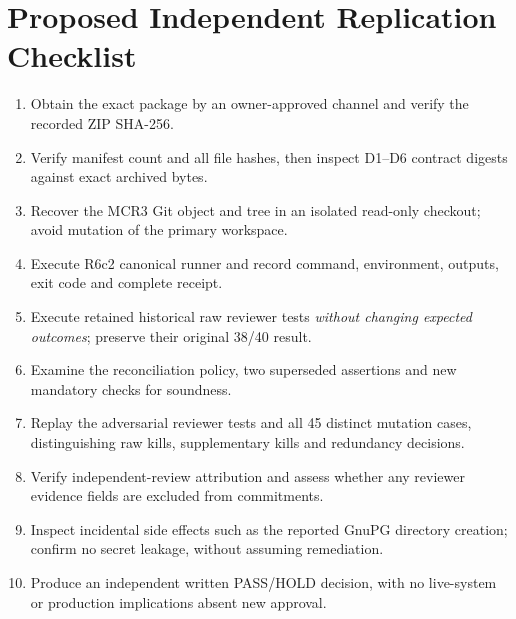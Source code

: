 \documentclass[11pt,twocolumn]{article}
\begin{document}
\section{Proposed Independent Replication Checklist}
\begin{enumerate}
\item Obtain the exact package by an owner-approved channel and verify the recorded ZIP SHA-256.
\item Verify manifest count and all file hashes, then inspect D1--D6 contract digests against exact archived bytes.
\item Recover the MCR3 Git object and tree in an isolated read-only checkout; avoid mutation of the primary workspace.
\item Execute R6c2 canonical runner and record command, environment, outputs, exit code and complete receipt.
\item Execute retained historical raw reviewer tests \emph{without changing expected outcomes}; preserve their original 38/40 result.
\item Examine the reconciliation policy, two superseded assertions and new mandatory checks for soundness.
\item Replay the adversarial reviewer tests and all 45 distinct mutation cases, distinguishing raw kills, supplementary kills and redundancy decisions.
\item Verify independent-review attribution and assess whether any reviewer evidence fields are excluded from commitments.
\item Inspect incidental side effects such as the reported GnuPG directory creation; confirm no secret leakage, without assuming remediation.
\item Produce an independent written PASS/HOLD decision, with no live-system or production implications absent new approval.
\end{enumerate}

\balance
\end{document}
